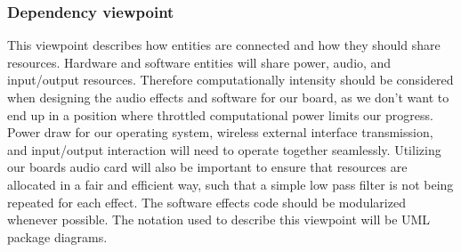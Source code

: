     
            

            
            

    
    \subsubsection{Dependency viewpoint}
        This viewpoint describes how entities are connected and how they should share resources.
        Hardware and software entities will share power, audio, and input/output resources. Therefore computationally intensity should be considered when designing the audio effects and software for our board, as we don't want to end up in a position where throttled computational power limits our progress. Power draw for our operating system, wireless external interface transmission, and input/output interaction will need to operate together seamlessly. Utilizing our boards audio card will also be important to ensure that resources are allocated in a fair and efficient way, such that a simple low pass filter is not being repeated for each effect. The software effects code should be modularized whenever possible. 
        The notation used to describe this viewpoint will be UML package diagrams.

